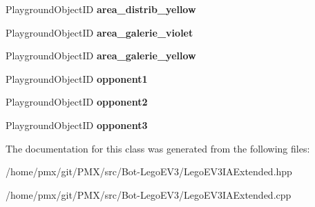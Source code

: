 \begin{DoxyCompactItemize}
\mbox{\label{classLegoEV3IAExtended_a8842f76728e1728af717eb51d1550f68}} 
Playground\+Object\+ID {\bfseries area\+\_\+distrib\+\_\+yellow}
\item 
\mbox{\label{classLegoEV3IAExtended_a9768aaa7aab159d8863f4684d6d00c43}} 
Playground\+Object\+ID {\bfseries area\+\_\+galerie\+\_\+violet}
\item 
\mbox{\label{classLegoEV3IAExtended_aa383c3cf75d44439c1e470297ca39d96}} 
Playground\+Object\+ID {\bfseries area\+\_\+galerie\+\_\+yellow}
\item 
\mbox{\label{classLegoEV3IAExtended_a6319c1832cf820663122aca7dbcccde1}} 
Playground\+Object\+ID {\bfseries opponent1}
\item 
\mbox{\label{classLegoEV3IAExtended_a2ed6b1a42fe331d4e48f464a28073c83}} 
Playground\+Object\+ID {\bfseries opponent2}
\item 
\mbox{\label{classLegoEV3IAExtended_a48e74a9bd7255cce2de908f190f89564}} 
Playground\+Object\+ID {\bfseries opponent3}
\end{DoxyCompactItemize}


The documentation for this class was generated from the following files\+:\begin{DoxyCompactItemize}
\item 
/home/pmx/git/\+P\+M\+X/src/\+Bot-\/\+Lego\+E\+V3/Lego\+E\+V3\+I\+A\+Extended.\+hpp\item 
/home/pmx/git/\+P\+M\+X/src/\+Bot-\/\+Lego\+E\+V3/Lego\+E\+V3\+I\+A\+Extended.\+cpp\end{DoxyCompactItemize}
